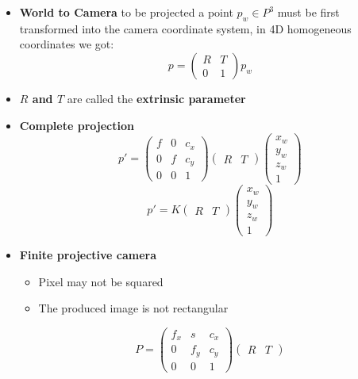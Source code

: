 \documentclass{article}
\begin{document}
\begin{itemize}
\begin{itemize}
\begin{itemize}
        \end{itemize}
        \item \textbf{World to Camera} to be projected a point \(p_w \in P^3\) must be first transformed into the camera coordinate system, in 4D homogeneous coordinates we got:
        \[p= \begin{pmatrix} R & T \\ 0 & 1 \end{pmatrix}p_w\]
        \item \textbf{\(R\) and \(T\)} are called the \textbf{extrinsic parameter}
        \item \textbf{Complete projection}
        \[
        p'=\begin{pmatrix}
            f & 0 & c_x\\
            0 & f & c_y\\
            0 & 0 & 1
        \end{pmatrix}\begin{pmatrix}
            R & T
        \end{pmatrix}\begin{pmatrix}
            x_w \\ y_w \\ z_w \\ 1
        \end{pmatrix}
        \]
        \[p'=K\begin{pmatrix} R & T \end{pmatrix}\begin{pmatrix}
            x_w \\ y_w \\ z_w \\ 1
        \end{pmatrix}\]
        \item \textbf{Finite projective camera}
        \begin{itemize}
            \item Pixel may not be squared
            \item The produced image is not rectangular
        \end{itemize}
        \[P = \begin{pmatrix}
            f_x & s & c_x\\
            0 & f_y & c_y\\
            0 & 0 & 1
        \end{pmatrix}\begin{pmatrix}
            R & T
        \end{pmatrix}\]
        

\end{itemize}
\end{itemize}
\end{document}
